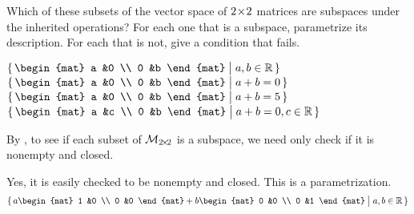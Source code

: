 \begin{exercises}
  \recommended \item
    Which of these subsets of the vector space of \( 2 \! \times \! 2 \) matrices
    are subspaces under the inherited operations?
    For each one that is a subspace, parametrize its description.
    For each that is not, give a condition that fails.
    \begin{exparts}
      \partsitem \( \set{\begin{mat}
                      a  &0  \\
                      0  &b
                    \end{mat}  \suchthat a,b\in\Re}  \)
      \partsitem \( \set{\begin{mat}
                      a  &0  \\
                      0  &b
                    \end{mat}  \suchthat a+b=0} \)
      \partsitem \( \set{\begin{mat}
                      a  &0  \\
                      0  &b
                    \end{mat}  \suchthat a+b=5} \)
      \partsitem \( \set{\begin{mat}
                      a  &c  \\
                      0  &b
                    \end{mat}  \suchthat a+b=0, c\in\Re} \)
    \end{exparts}
    \begin{answer}
      By , to see if each
      subset of $\mathcal{M}_{2 \! \times \! 2}$ is a subspace, we need only
      check if it is nonempty and closed.
      \begin{exparts}
        \partsitem Yes, it is easily checked to be nonempty and closed.
          This is a parametrization.
          \begin{equation*}
            \set{a\begin{mat}
                    1  &0  \\
                    0  &0
                  \end{mat}
                 +b\begin{mat}
                    0  &0  \\
                    0  &1  
                   \end{mat}
                 \suchthat a,b\in\Re}
          \end{equation*}

\end{exparts}
\end{answer}
\end{exercises}
